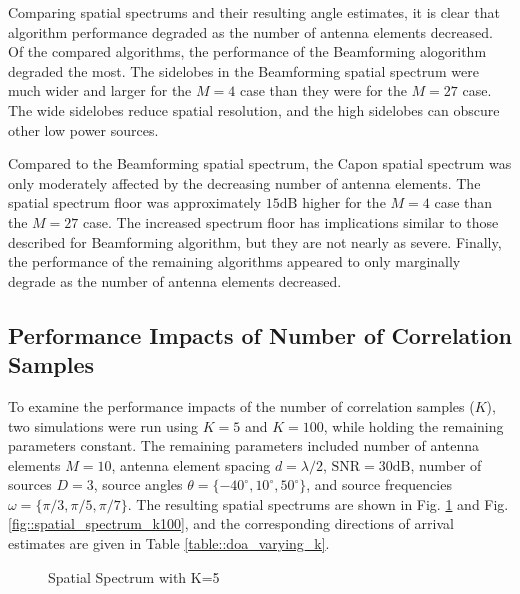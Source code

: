 \documentclass[conference]{IEEEtran}
\begin{document}
		Comparing spatial spectrums and their resulting angle estimates, it is clear that algorithm performance degraded as the number of antenna elements decreased. Of the compared algorithms, the performance of the Beamforming alogorithm degraded the most. The sidelobes in the Beamforming spatial spectrum were much wider and larger for the $M=4$ case than they were for the $M=27$ case. The wide sidelobes reduce spatial resolution, and the high sidelobes can obscure other low power sources. 
		
		Compared to the Beamforming spatial spectrum, the Capon spatial spectrum was only moderately affected by the decreasing number of antenna elements. The spatial spectrum floor was approximately $15\text{dB}$ higher for the $M=4$ case than the $M=27$ case. The increased spectrum floor has implications similar to those described for Beamforming algorithm, but they are not nearly as severe. Finally, the performance of the remaining algorithms appeared to only marginally degrade as the number of antenna elements decreased.
		
		\subsection{Performance Impacts of Number of Correlation Samples}
		
		To examine the performance impacts of the number of correlation samples ($K$), two simulations were run using $K=5$ and $K=100$, while holding the remaining parameters constant. The remaining parameters included number of antenna elements $M=10$, antenna element spacing $d = \lambda/2$, $\text{SNR}=30\text{dB}$, number of sources $D=3$, source angles $\theta = \{-40^{\circ}, 10^{\circ}, 50^{\circ}\}$, and source frequencies $\omega = \{\pi/3, \pi/5, \pi/7\}$. The resulting spatial spectrums are shown in Fig. \ref{fig::spatial_spectrum_k5} and Fig. \ref{fig::spatial_spectrum_k100}, and the corresponding directions of arrival estimates are given in Table \ref{table::doa_varying_k}.
		
		\begin{figure}
			\centerline{}
			\caption{Spatial Spectrum with K=5}
			\label{fig::spatial_spectrum_k5}
		\end{figure}
		
\end{document}

